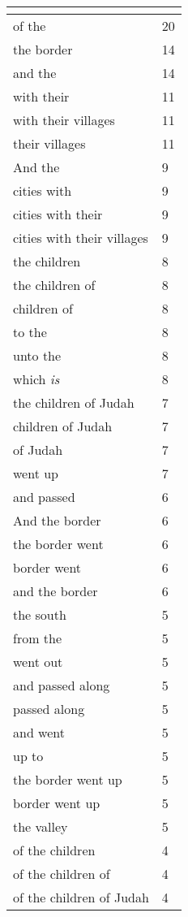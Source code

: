 \begin{center}
\begin{longtable}{|p{3.0in}|p{0.5in}|}
\hline \multicolumn{2}{c}{{ }} \\ \hline
\endfoot 
of the & 20\\ \hline 
the border & 14\\ \hline 
and the & 14\\ \hline 
with their & 11\\ \hline 
with their villages & 11\\ \hline 
their villages & 11\\ \hline 
And the & 9\\ \hline 
cities with & 9\\ \hline 
cities with their & 9\\ \hline 
cities with their villages & 9\\ \hline 
the children & 8\\ \hline 
the children of & 8\\ \hline 
children of & 8\\ \hline 
to the & 8\\ \hline 
unto the & 8\\ \hline 
which \emph{is} & 8\\ \hline 
the children of Judah & 7\\ \hline 
children of Judah & 7\\ \hline 
of Judah & 7\\ \hline 
went up & 7\\ \hline 
and passed & 6\\ \hline 
And the border & 6\\ \hline 
the border went & 6\\ \hline 
border went & 6\\ \hline 
and the border & 6\\ \hline 
the south & 5\\ \hline 
from the & 5\\ \hline 
went out & 5\\ \hline 
and passed along & 5\\ \hline 
passed along & 5\\ \hline 
and went & 5\\ \hline 
up to & 5\\ \hline 
the border went up & 5\\ \hline 
border went up & 5\\ \hline 
the valley & 5\\ \hline 
of the children & 4\\ \hline 
of the children of & 4\\ \hline 
of the children of Judah & 4\\ \hline 

\end{longtable}
\end{center}
